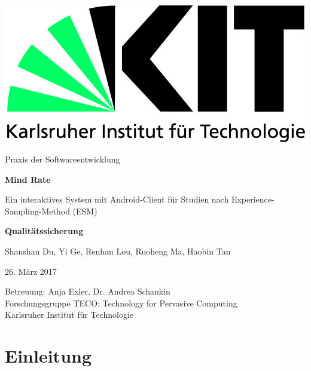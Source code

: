 \documentclass[a4paper]{scrreprt}
\begin{document}
    \begin{flushright}
        \includegraphics[scale = 0.7]{kit-logo.jpg}\\[0.5cm]
    \end{flushright}
    \vspace*{2cm}

    \begin{center} \large

        Praxis der Softwareentwicklung
        \vspace * {1.5cm}

        \textbf{\huge Mind Rate}

        \vspace*{1cm}


        {\Large Ein interaktives System mit Android-Client f\"ur Studien nach Experience-Sampling-Method (ESM)}

        \vspace*{1cm}

        \textbf{\Large Qualit\"atssicherung}
        \vspace*{2cm}

        Shanshan Du, Yi Ge, Renhan Lou, Ruoheng Ma, Haobin Tan
        \vspace*{1cm}

        26. M\"arz 2017
        \vspace*{2.5cm}

        Betreuung: Anja Exler, Dr. Andrea Schankin\\[0.5cm]
        Forschungsgruppe TECO: Technology for Pervasive Computing\\[0.5cm]

        Karlsruher Institut für Technologie
    \end{center}
    \thispagestyle{empty}

    \tableofcontents

    \chapter{Einleitung}
\end{document}

